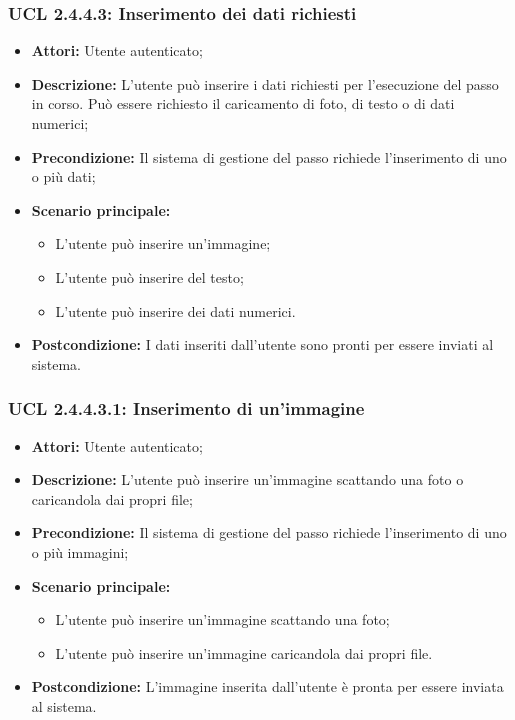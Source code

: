 \hypertarget{L2.4.4.3}{}
\subsubsection{UCL 2.4.4.3: Inserimento dei dati richiesti}
\begin{itemize}
\item \textbf{Attori:} Utente autenticato;
\item \textbf{Descrizione:} L'utente può inserire i dati richiesti per l'esecuzione del passo in corso. Può essere richiesto il caricamento di foto, di testo o di dati numerici; 
\item \textbf{Precondizione:} Il sistema di gestione del passo richiede l'inserimento di uno o più dati;
\item \textbf{Scenario principale:}
\begin{itemize}
\item L'utente può inserire un'immagine;
\item L'utente può inserire del testo;
\item L'utente può inserire dei dati numerici.
\end{itemize}
\item \textbf{Postcondizione:} I dati inseriti dall'utente sono pronti per essere inviati al sistema.
\end{itemize}

\hypertarget{L2.4.4.3.1}{}
\subsubsection{UCL 2.4.4.3.1: Inserimento di un'immagine}
\begin{itemize}
\item \textbf{Attori:} Utente autenticato;
\item \textbf{Descrizione:} L'utente può inserire un'immagine scattando una foto o caricandola dai propri file;
\item \textbf{Precondizione:} Il sistema di gestione del passo richiede l'inserimento di uno o più immagini;
\item \textbf{Scenario principale:}
\begin{itemize}
\item L'utente può inserire un'immagine scattando una foto;
\item L'utente può inserire un'immagine caricandola dai propri file.
\end{itemize}
\item \textbf{Postcondizione:} L'immagine inserita dall'utente è pronta per essere inviata al sistema.
\end{itemize}

